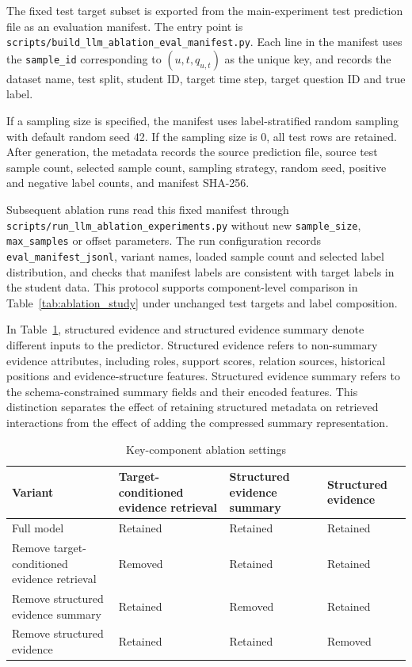\documentclass[a4paper,12pt]{article}
\numberwithin{table}{section}
\begin{document}
The fixed test target subset is exported from the main-experiment test prediction file as an evaluation manifest. The entry point is \texttt{scripts/build\_llm\_ablation\_eval\_manifest.py}. Each line in the manifest uses the \texttt{sample\_id} corresponding to \((u,t,q_{u,t})\) as the unique key, and records the dataset name, test split, student ID, target time step, target question ID and true label.

If a sampling size is specified, the manifest uses label-stratified random sampling with default random seed 42. If the sampling size is 0, all test rows are retained. After generation, the metadata records the source prediction file, source test sample count, selected sample count, sampling strategy, random seed, positive and negative label counts, and manifest SHA-256.

Subsequent ablation runs read this fixed manifest through \texttt{scripts/run\_llm\_ablation\_experiments.py} without new \texttt{sample\_size}, \texttt{max\_samples} or offset parameters. The run configuration records \texttt{eval\_manifest\_jsonl}, variant names, loaded sample count and selected label distribution, and checks that manifest labels are consistent with target labels in the student data. This protocol supports component-level comparison in Table~\ref{tab:ablation_study} under unchanged test targets and label composition.

In Table~\ref{tab:appendix-ablation-design}, structured evidence and structured evidence summary denote different inputs to the predictor. Structured evidence refers to non-summary evidence attributes, including roles, support scores, relation sources, historical positions and evidence-structure features. Structured evidence summary refers to the schema-constrained summary fields and their encoded features. This distinction separates the effect of retaining structured metadata on retrieved interactions from the effect of adding the compressed summary representation.

\begin{table}[htbp]
\centering
\small
\caption{Key-component ablation settings}
\label{tab:appendix-ablation-design}
\begin{tabularx}{\textwidth}{p{3.3cm}XXX}
\toprule
\textbf{Variant} & \textbf{Target-conditioned evidence retrieval} & \textbf{Structured evidence summary} & \textbf{Structured evidence} \\
\midrule
Full model & Retained & Retained & Retained \\
Remove target-conditioned evidence retrieval & Removed & Retained & Retained \\
Remove structured evidence summary & Retained & Removed & Retained \\
Remove structured evidence & Retained & Retained & Removed \\
\bottomrule
\end{tabularx}
\end{table}
\end{document}
